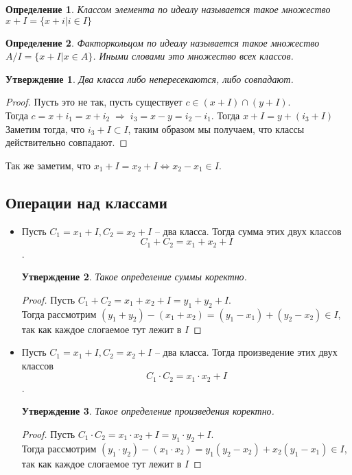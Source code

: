 \documentclass[12pt, a4paper]{article}
\newcommand{\lra}{\Leftrightarrow}
\newcommand{\ra}{\;\Rightarrow\;}
\theoremstyle{plain}
\newtheorem{Def}{Определение}
\newtheorem*{Statement*}{Утверждение}
\theoremstyle{definition}
\begin{document}
\begin{Def}
Классом элемента по идеалу называется такое множество $x+I = \{x+i|i \in I\}$
\end{Def}
\begin{Def}
Факторкольцом по идеалу называется такое множество $A/I = \{x+I|x\in A\}$. Иными словами это множество всех классов.
\end{Def}
\begin{Statement*}
    Два класса либо непересекаются, либо совпадают.
\end{Statement*}
\begin{proof}
    Пусть это не так, пусть существует $c\in (x+I)\cap (y+I)$. \\Тогда $c = x+i_1 = x+i_2\ra i_3 = x-y = i_2-i_1$. Тогда $x+I = y+ (i_3+I)$ Заметим тогда, что $i_3+I\subset I$, таким образом мы получаем, что классы действительно совпадают.
\end{proof}
Так же заметим, что $x_1+I = x_2 + I \lra x_2-x_1\in I$. 
\subsection*{Операции над классами}
\begin{itemize}
    \item Пусть $C_1 = x_1+I,C_2 = x_2+I$ -- два класса. Тогда сумма этих двух классов \[C_1+C_2 = x_1+x_2+I\].
    \begin{Statement*}
        Такое определение суммы коректно.
    \end{Statement*}
    \begin{proof}
        Пусть $C_1+C_2 = x_1+x_2+I=y_1+y_2+I$.\\ Тогда рассмотрим $(y_1+y_2)-(x_1+x_2) = (y_1 - x_1)+(y_2-x_2)\in I$, так как каждое слогаемое тут лежит в $I$
    \end{proof}
    \item Пусть $C_1 = x_1+I,C_2 = x_2+I$ -- два класса. Тогда произведение этих двух классов \[C_1\cdot C_2 = x_1\cdot x_2+I\].
    \begin{Statement*}
        Такое определение произведения коректно.
    \end{Statement*}
    \begin{proof}
        Пусть $C_1\cdot C_2 = x_1\cdot x_2+I = y_1\cdot y_2+I$.\\ Тогда рассмотрим $(y_1\cdot y_2)-(x_1\cdot x_2) = y_1(y_2 - x_2)+x_2(y_1-x_1)\in I$, так как каждое слогаемое тут лежит в $I$
    \end{proof}
\end{itemize}
\end{document}
